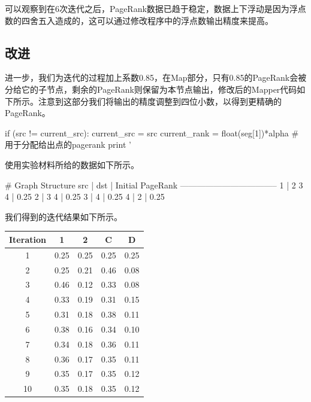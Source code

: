 \documentclass{article}
\begin{document}
可以观察到在6次迭代之后，PageRank数据已趋于稳定，数据上下浮动是因为浮点数的四舍五入造成的，这可以通过修改程序中的浮点数输出精度来提高。

\subsection{改进}
进一步，我们为迭代的过程加上系数0.85，在Map部分，只有0.85的PageRank会被分给它的子节点，剩余的PageRank则保留为本节点输出，修改后的Mapper代码如下所示。注意到这部分我们将输出的精度调整到四位小数，以得到更精确的PageRank。
\begin{python}
if (src != current_src):
   current_src = src
   current_rank = float(seg[1])*alpha                # 用于分配给出点的pagerank
   print '%
\end{python}

使用实验材料所给的数据如下所示。

\begin{python}
# Graph Structure
src | dst      | Initial PageRank
-----------------------------------
 1  | 2 3 4    | 0.25
 2  | 3 4      | 0.25
 3  | 4        | 0.25
 4  | 2        | 0.25
\end{python}

我们得到的迭代结果如下所示。
\begin{center}
\begin{table}[]
\begin{tabular}{ccccc}
\hline
\textbf{Iteration} & \textbf{1} & \textbf{2} & \textbf{C} & \textbf{D} \\ \hline
1                  & 0.25       & 0.25       & 0.25       & 0.25       \\
2                  & 0.25       & 0.21       & 0.46       & 0.08       \\
3                  & 0.46       & 0.12       & 0.33       & 0.08       \\
4                  & 0.33       & 0.19       & 0.31       & 0.15       \\
5                  & 0.31       & 0.18       & 0.38       & 0.11       \\
6                  & 0.38       & 0.16       & 0.34       & 0.10       \\
7                  & 0.34       & 0.18       & 0.36       & 0.11       \\
8                  & 0.36       & 0.17       & 0.35       & 0.11       \\
9                  & 0.35       & 0.17       & 0.35       & 0.12       \\
10                 & 0.35       & 0.18       & 0.35       & 0.12       \\ \hline
\end{tabular}
\end{table}
\end{center}
\end{document}
